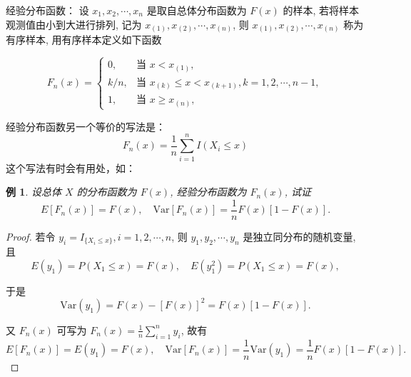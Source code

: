 \documentclass[a4paper]{ctexart}
\newtheorem{example}{例}[section]
\begin{document}
经验分布函数：
设 \(x_1, x_2, \cdots, x_n\) 是取自总体分布函数为 \(F(x)\) 的样本, 若将样本观测值由小到大进行排列, 记为 \(x_{(1)}, x_{(2)}, \cdots, x_{(n)}\), 则 \(x_{(1)}, x_{(2)}, \cdots, x_{(n)}\) 称为有序样本, 用有序样本定义如下函数

\[
F_n(x) = \begin{cases} 
0, & \text{当 } x < x_{(1)}, \\ 
k/n, & \text{当 } x_{(k)} \leqslant x < x_{(k+1)}, k = 1, 2, \cdots, n-1, \\ 
1, & \text{当 } x \geqslant x_{(n)}, 
\end{cases}
\]
\begin{tipbox}
    经验分布函数另一个等价的写法是：$$F_n(x) = \frac{1}{n} \sum_{i=1}^{n} I(X_i \le x)$$这个写法有时会有用处，如：
    \begin{example}
        设总体 \(X\) 的分布函数为 \(F(x)\), 经验分布函数为 \(F_n(x)\), 试证
        \[
        E[F_n(x)] = F(x), \quad \text{Var}[F_n(x)] = \frac{1}{n} F(x)[1 - F(x)].
        \]
    \end{example}
    \begin{proof}
        若令 \(y_i = I_{\{X_i \leqslant x\}}, i = 1, 2, \cdots, n\), 则 \(y_1, y_2, \cdots, y_n\) 是独立同分布的随机变量, 且
        \[
        E(y_1) = P(X_1 \leqslant x) = F(x), \quad E(y_1^2) = P(X_1 \leqslant x) = F(x),
        \]

        于是
        \[
        \text{Var}(y_1) = F(x) - [F(x)]^2 = F(x)[1 - F(x)].
        \]

        又 \(F_n(x)\) 可写为 \(F_n(x) = \frac{1}{n} \sum_{i=1}^n y_i\), 故有
        \[
        E[F_n(x)] = E(y_1) = F(x), \quad \text{Var}[F_n(x)] = \frac{1}{n} \text{Var}(y_1) = \frac{1}{n} F(x)[1 - F(x)].
        \]
    \end{proof}
\end{tipbox}
\end{document}
